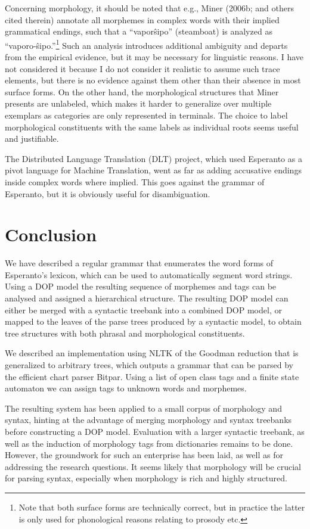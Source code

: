 \documentclass[10pt,a4paper]{article}
\begin{document}
Concerning morphology, it should be noted that e.g., Miner (2006b; and others
cited therein) annotate all morphemes in complex words with their implied
grammatical endings, such that a ``vapor\^sipo'' (steamboat) is analyzed as
``vaporo-\^sipo.''\footnote{Note that both surface forms are technically
correct, but in practice the latter is only used for phonological reasons relating to
prosody etc.} Such an analysis introduces additional ambiguity and departs from
the empirical evidence, but it may be necessary for linguistic reasons.  I have
not considered it because I do not consider it realistic to assume such trace
elements, but there is no evidence against them other than their absence in
most surface forms. On the other hand, the morphological structures that Miner
presents are unlabeled, which makes it harder to generalize over multiple
exemplars as categories are only represented in terminals. The choice to label
morphological constituents with the same labels as individual roots seems
useful and justifiable.

The Distributed Language Translation (DLT) project, which used Esperanto as a
pivot language for Machine Translation, went as far as adding accusative
endings inside complex words where implied. This goes against the grammar of
Esperanto, but it is obviously useful for disambiguation.

\section{Conclusion}

We have described a regular grammar that enumerates the word forms of
Esperanto's lexicon, which can be used to automatically segment word strings.
Using a DOP model the resulting sequence of morphemes and tags can be analysed
and assigned a hierarchical structure. The resulting DOP model can either be
merged with a syntactic treebank into a combined DOP model, or mapped to the
leaves of the parse trees produced by a syntactic model, to obtain tree
structures with both phrasal and morphological constituents.

We described an implementation using NLTK of the Goodman reduction that is
generalized to arbitrary trees, which outputs a grammar that can be parsed by
the efficient chart parser Bitpar. Using a list of open class tags and a
finite state automaton we can assign tags to unknown words and
morphemes.

The resulting system has been applied to a small corpus of morphology and
syntax, hinting at the advantage of merging morphology and syntax treebanks
before constructing a DOP model. Evaluation with a larger syntactic treebank,
as well as the induction of morphology tags from dictionaries remains to be
done. However, the groundwork for such an enterprise has been laid, as well as
for addressing the research questions. It seems likely that morphology
will be crucial for parsing syntax, especially when morphology is rich 
and highly structured.
\end{document}
